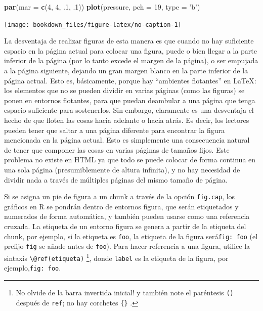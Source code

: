 \documentclass[12pt,]{krantz}
\makeatletter
\newenvironment{Shaded}{\begin{snugshade}}{\end{snugshade}}
\newcommand{\KeywordTok}[1]{\textcolor[rgb]{0.13,0.29,0.53}{\textbf{{#1}}}}
\newcommand{\DataTypeTok}[1]{\textcolor[rgb]{0.13,0.29,0.53}{{#1}}}
\newcommand{\DecValTok}[1]{\textcolor[rgb]{0.00,0.00,0.81}{{#1}}}
\newcommand{\StringTok}[1]{\textcolor[rgb]{0.31,0.60,0.02}{{#1}}}
\newcommand{\NormalTok}[1]{{#1}}
\newenvironment{kframe}{%
\medskip{}
\setlength{\fboxsep}{.8em}
 \def\at@end@of@kframe{}%
 \ifinner\ifhmode%
  \def\at@end@of@kframe{\end{minipage}}%
  \begin{minipage}{\columnwidth}%
 \fi\fi%
 \def\FrameCommand##1{\hskip\@totalleftmargin \hskip-\fboxsep
 \colorbox{shadecolor}{##1}\hskip-\fboxsep
     \hskip-\linewidth \hskip-\@totalleftmargin \hskip\columnwidth}%
 \MakeFramed {\advance\hsize-\width
   \@totalleftmargin\z@ \linewidth\hsize
   \@setminipage}}%
 {\par\unskip\endMakeFramed%
 \at@end@of@kframe}
\renewenvironment{Shaded}{\begin{kframe}}{\end{kframe}}
\theoremstyle{definition}
\theoremstyle{definition}
\theoremstyle{remark}
\makeatother
\begin{document}
\begin{Shaded}
\begin{Highlighting}[]
\KeywordTok{par}\NormalTok{(}\DataTypeTok{mar =} \KeywordTok{c}\NormalTok{(}\DecValTok{4}\NormalTok{, }\DecValTok{4}\NormalTok{, .}\DecValTok{1}\NormalTok{, .}\DecValTok{1}\NormalTok{))}
\KeywordTok{plot}\NormalTok{(pressure, }\DataTypeTok{pch =} \DecValTok{19}\NormalTok{, }\DataTypeTok{type =} \StringTok{'b'}\NormalTok{)}
\end{Highlighting}
\end{Shaded}

\begin{center}\texttt{[image: bookdown\_files/figure-latex/no-caption-1]} \end{center}

La desventaja de realizar figuras de esta manera es que cuando no hay
suficiente espacio en la página actual para colocar una figura, puede o
bien llegar a la parte inferior de la página (por lo tanto excede el
margen de la página), o ser empujada a la página siguiente, dejando un
gran margen blanco en la parte inferior de la página actual. Esto es,
básicamente, porque hay ``ambientes flotantes'' en LaTeX: los elementos
que no se pueden dividir en varias páginas (como las figuras) se ponen
en entornos flotantes, para que puedan deambular a una página que tenga
espacio suficiente para sostenerlos. Sin embargo, claramente es una
desventaja el hecho de que floten las cosas hacia adelante o hacia
atrás. Es decir, los lectores pueden tener que saltar a una página
diferente para encontrar la figura mencionada en la página actual. Esto
es simplemente una consecuencia natural de tener que componer las cosas
en varias páginas de tamaños fijos. Este problema no existe en HTML ya
que todo se puede colocar de forma continua en una sola página
(presumiblemente de altura infinita), y no hay necesidad de dividir nada
a través de múltiples páginas del mismo tamaño de página.

Si se asigna un pie de figura a un chunk a través de la opción
\texttt{fig.cap}, los gráficos en R se pondrán dentro de entornos
figura, que serán etiquetados y numerados de forma automática, y también
pueden usarse como una referencia cruzada. La etiqueta de un entorno
figura se genera a partir de la etiqueta del chunk, por ejemplo, si la
etiqueta es \texttt{foo}, la etiqueta de la figura
será\texttt{fig:\ foo} (el prefijo \texttt{fig} se añade antes de
\texttt{foo}). Para hacer referencia a una figura, utilice la sintaxis
\texttt{\textbackslash{}@ref(etiqueta)} \footnote{No olvide de la barra
  invertida inicial! y también note el paréntesis \texttt{()} después de
  \texttt{ref}; no hay corchetes \texttt{\{\}} .}, donde \texttt{label}
es la etiqueta de la figura, por ejemplo,\texttt{fig:\ foo}.
\end{document}
